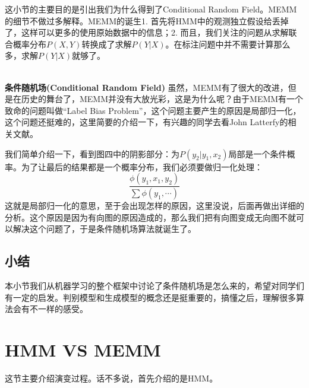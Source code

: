 \documentclass[a4paper]{article}
\begin{document}
这小节的主要目的是引出我们为什么得到了Conditional Random Field。MEMM的细节不做过多解释。MEMM的诞生1. 首先将HMM中的观测独立假设给丢掉了，这样可以更多的使用原始数据中的信息；2. 而且，我们关注的问题从求解联合概率分布$P(X,Y)$转换成了求解$P(Y|X)$。在标注问题中并不需要计算那么多，求解$P(Y|X)$就够了。

~\\
\noindent \textbf{条件随机场(Conditional Random Field)}
虽然，MEMM有了很大的改进，但是在历史的舞台了，MEMM并没有大放光彩，这是为什么呢？由于MEMM有一个致命的问题叫做“Label Bias Problem”，这个问题主要产生的原因是局部归一化，这个问题还挺难的，这里简要的介绍一下，有兴趣的同学去看John Latterfy的相关文献。

我们简单介绍一下，看到图四中的阴影部分：为$P(y_2|y_1,x_2)$局部是一个条件概率。为了让最后的结果都是一个概率分布，我们必须要做归一化处理：
$$
\frac{\phi(y_1,x_1,y_2)}{\sum \phi (y_1,\cdots)}
$$
这就是局部归一化的意思，至于会出现怎样的原因，这里没说，后面再做出详细的分析。这个原因是因为有向图的原因造成的，那么我们把有向图变成无向图不就可以解决这个问题了，于是条件随机场算法就诞生了。

\subsection{小结}
本小节我们从机器学习的整个框架中讨论了条件随机场是怎么来的，希望对同学们有一定的启发。判别模型和生成模型的概念还是挺重要的，搞懂之后，理解很多算法会有不一样的感受。

\section{HMM VS MEMM}
这节主要介绍演变过程。话不多说，首先介绍的是HMM。
\end{document}
